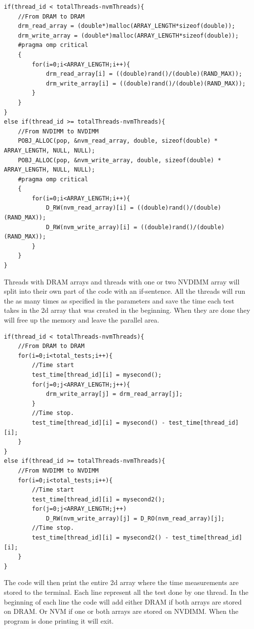 \documentclass[12pt,a4paper,USenglish]{article}      %
\begin{document}
\begin{lstlisting}[caption=Creation of DRAM and NVDIMM arrays]
if(thread_id < totalThreads-nvmThreads){
	//From DRAM to DRAM
	drm_read_array = (double*)malloc(ARRAY_LENGTH*sizeof(double));
	drm_write_array = (double*)malloc(ARRAY_LENGTH*sizeof(double));
	#pragma omp critical
	{
		for(i=0;i<ARRAY_LENGTH;i++){
			drm_read_array[i] = ((double)rand()/(double)(RAND_MAX));
			drm_write_array[i] = ((double)rand()/(double)(RAND_MAX));
		}
	}
}
else if(thread_id >= totalThreads-nvmThreads){
	//From NVDIMM to NVDIMM
	POBJ_ALLOC(pop, &nvm_read_array, double, sizeof(double) * ARRAY_LENGTH, NULL, NULL);
	POBJ_ALLOC(pop, &nvm_write_array, double, sizeof(double) * ARRAY_LENGTH, NULL, NULL);
	#pragma omp critical
	{
		for(i=0;i<ARRAY_LENGTH;i++){
			D_RW(nvm_read_array)[i] = ((double)rand()/(double)(RAND_MAX));
			D_RW(nvm_write_array)[i] = ((double)rand()/(double)(RAND_MAX));
		}
	}
}
\end{lstlisting}

Threads with DRAM arrays and threads with one or two NVDIMM array will split into their own part of the code with an if-sentence. All the threads will run the as many times as specified in the parameters and save the time each test takes in the 2d array that was created in the beginning. When they are done they will free up the memory and leave the parallel area. 

\begin{lstlisting}[caption=Threads running their test.]
if(thread_id < totalThreads-nvmThreads){
	//From DRAM to DRAM
	for(i=0;i<total_tests;i++){
		//Time start
		test_time[thread_id][i] = mysecond();
		for(j=0;j<ARRAY_LENGTH;j++){
			drm_write_array[j] = drm_read_array[j];
		}			
		//Time stop.
		test_time[thread_id][i] = mysecond() - test_time[thread_id][i];
	}
}
else if(thread_id >= totalThreads-nvmThreads){
	//From NVDIMM to NVDIMM
	for(i=0;i<total_tests;i++){
		//Time start
		test_time[thread_id][i] = mysecond2();
		for(j=0;j<ARRAY_LENGTH;j++)
			D_RW(nvm_write_array)[j] = D_RO(nvm_read_array)[j];		
		//Time stop.
		test_time[thread_id][i] = mysecond2() - test_time[thread_id][i];
	}
}
\end{lstlisting}

The code will then print the entire 2d array where the time measurements are stored to the terminal. Each line represent all the test done by one thread. In the beginning of each line the code will add either DRAM if both arrays are stored on DRAM. Or NVM if one or both arrays are stored on NVDIMM. When the program is done printing it will exit.
\end{document}
